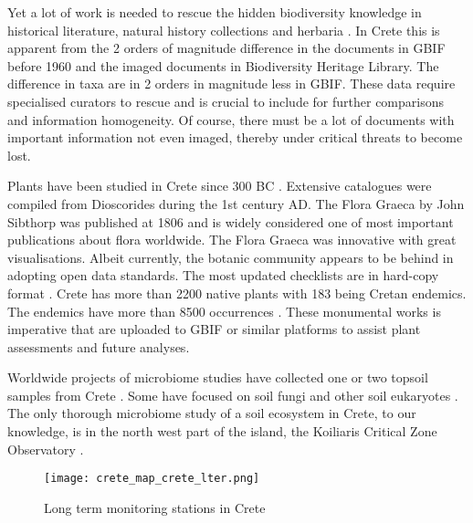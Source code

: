 Yet a lot of work is needed to rescue the hidden biodiversity knowledge in
historical literature, natural history collections and herbaria \parencite{Paragkamian2022}.
In Crete this is apparent from the 2 orders of magnitude difference in the documents
in GBIF before 1960 and the imaged documents in Biodiversity Heritage Library. The 
difference in taxa are in 2 orders in magnitude less in GBIF. These data 
require specialised curators to rescue and is crucial to include for 
further comparisons and information homogeneity. Of course, there must be 
a lot of documents with important information not even imaged, thereby under 
critical threats to become lost.

Plants have been studied in Crete since 300 BC \parencite{Krimbas_2005}. 
Extensive catalogues were compiled from Dioscorides during the 1st century AD. 
The Flora Graeca by John Sibthorp was published at 1806 and is widely 
considered one of most important publications about flora worldwide.
The Flora Graeca was innovative with great visualisations. 
Albeit currently, the botanic community appears to be behind 
in adopting open data standards. The most updated checklists 
are in hard-copy format 
\parencite{dimopoulos2016,strid2024atlas,ralph1993flora}.
Crete has more than 2200 native plants with 183 being Cretan endemics. 
The endemics have more than 8500 occurrences \parencite{kougioumoutzis2020plant}.
These monumental works is imperative that are uploaded to GBIF or similar
platforms to assist plant assessments and future analyses.

Worldwide projects of microbiome studies have collected one or two topsoil
samples from Crete \parencite{Vasar2022, Labouyrie2023, Bahram2018, Orgiazzi2018}.
Some have focused on soil fungi \parencite{Mikryukov2023, Davison2021, Tedersoo2021}
and other soil eukaryotes \parencite{Aslani2022}.
The only thorough microbiome study of a soil ecosystem in Crete, to our knowledge,
is in the north west part of the island, the Koiliaris Critical Zone Observatory \parencite{tsiknia2014}.

\begin{figure}[hbt!] 
    \centering\texttt{[image: crete\_map\_crete\_lter.png]}
    \caption[LTERs in Crete]{Long term monitoring stations in Crete}
    \label{fig:crete-lter}
\end{figure}


